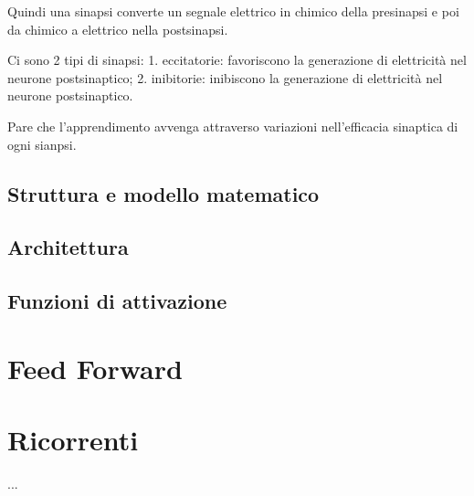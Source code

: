 \documentclass[12pt,a4paper,oneside]{book}
\begin{document}
		Quindi una sinapsi converte un segnale elettrico in chimico della presinapsi e poi da chimico a elettrico nella postsinapsi. 
		
		Ci sono 2 tipi di sinapsi: 1. eccitatorie: favoriscono la generazione di elettricità nel neurone postsinaptico; 2. inibitorie: inibiscono la generazione di elettricità nel neurone postsinaptico. 
		
		Pare che l'apprendimento avvenga attraverso variazioni nell'efficacia sinaptica di ogni sianpsi. 
		
		
		
		\section{Struttura e modello matematico}
		\section{Architettura}
		\section{Funzioni di attivazione}
	
	\chapter{Feed Forward}
	\chapter{Ricorrenti}

\clearpage 
{}
\begin{thebibliography}{hetichetta più lungai}  ... 
\end{thebibliography}
	
\end{document}
